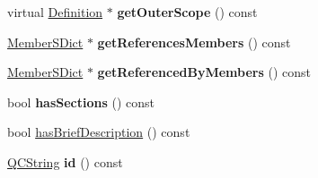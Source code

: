 \begin{DoxyCompactItemize}
\item 
\hypertarget{class_definition_a810fdea11067b8943db696963a28b691}{virtual \hyperlink{class_definition}{Definition} $\ast$ {\bfseries get\-Outer\-Scope} () const }\label{class_definition_a810fdea11067b8943db696963a28b691}

\item 
\hypertarget{class_definition_a63338ee84c8ee7835cd4d6c64bf6e190}{\hyperlink{class_member_s_dict}{Member\-S\-Dict} $\ast$ {\bfseries get\-References\-Members} () const }\label{class_definition_a63338ee84c8ee7835cd4d6c64bf6e190}

\item 
\hypertarget{class_definition_a8a1b34011aa8ad70d3bbe4ed36017cf2}{\hyperlink{class_member_s_dict}{Member\-S\-Dict} $\ast$ {\bfseries get\-Referenced\-By\-Members} () const }\label{class_definition_a8a1b34011aa8ad70d3bbe4ed36017cf2}

\item 
\hypertarget{class_definition_a38acc58f067938aaedeef6cf2f28de3d}{bool {\bfseries has\-Sections} () const }\label{class_definition_a38acc58f067938aaedeef6cf2f28de3d}

\item 
bool \hyperlink{class_definition_ae27579a021a1cc9eb9773665996b2641}{has\-Brief\-Description} () const 
\item 
\hypertarget{class_definition_a16d494b2a3ca96cb4fcb0560a52b52f2}{\hyperlink{class_q_c_string}{Q\-C\-String} {\bfseries id} () const }\label{class_definition_a16d494b2a3ca96cb4fcb0560a52b52f2}


\end{DoxyCompactItemize}
